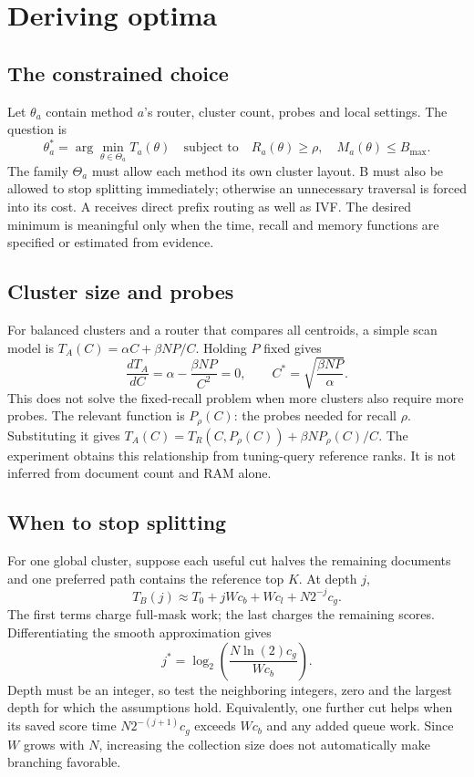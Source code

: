 \newpage
\section{Deriving optima}
\subsection{The constrained choice}
Let $\theta_a$ contain method $a$'s router, cluster count, probes and local settings. The
question is
\begin{equation}
 \theta_a^*=\arg\min_{\theta\in\Theta_a} T_a(\theta)
 \quad\text{subject to}\quad R_a(\theta)\ge\rho,\quad M_a(\theta)\le B_{\max}.
 \label{eq:optimum}
\end{equation}
The family $\Theta_a$ must allow each method its own cluster layout. B must also be allowed
to stop splitting immediately; otherwise an unnecessary traversal is forced into its cost.
A receives direct prefix routing as well as IVF. The desired minimum is meaningful only
when the time, recall and memory functions are specified or estimated from evidence.

\subsection{Cluster size and probes}
For balanced clusters and a router that compares all centroids, a simple scan model is
$T_A(C)=\alpha C+\beta NP/C$. Holding $P$ fixed gives
\begin{equation}
 \frac{dT_A}{dC}=\alpha-\frac{\beta NP}{C^2}=0,
 \qquad C^*=\sqrt{\frac{\beta NP}{\alpha}}.
 \label{eq:cluster-optimum}
\end{equation}
This does not solve the fixed-recall problem when more clusters also require more probes.
The relevant function is $P_\rho(C)$: the probes needed for recall $\rho$. Substituting it
gives $T_A(C)=T_R(C,P_\rho(C))+\beta NP_\rho(C)/C$. The experiment obtains this relationship
from tuning-query reference ranks. It is not inferred from document count and RAM alone.

\subsection{When to stop splitting}
For one global cluster, suppose each useful cut halves the remaining documents and one
preferred path contains the reference top $K$. At depth $j$,
\begin{equation}
 T_B(j)\approx T_0+jWc_b+Wc_l+N2^{-j}c_g.
 \label{eq:depth}
\end{equation}
The first terms charge full-mask work; the last charges the remaining scores. Differentiating
the smooth approximation gives
\begin{equation}
 j^*=\log_2\!\left(\frac{N\ln(2)c_g}{Wc_b}\right).
 \label{eq:depth-optimum}
\end{equation}
Depth must be an integer, so test the neighboring integers, zero and the largest depth for
which the assumptions hold. Equivalently, one further cut helps when its saved score time
$N2^{-(j+1)}c_g$ exceeds $Wc_b$ and any added queue work. Since $W$ grows with $N$, increasing
the collection size does not automatically make branching favorable.

